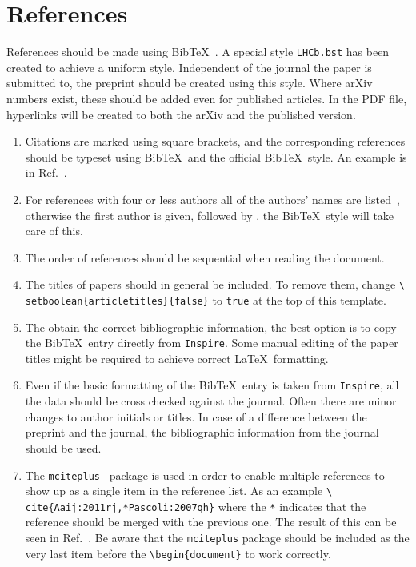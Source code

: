 \section{References}
\label{sec:References}

References should be made using Bib\TeX~\cite{BibTeX}. A special style
\texttt{LHCb.bst} has been created to achieve a uniform
style. Independent of the journal the paper is submitted to, the
preprint should be created using this style. Where arXiv numbers
exist, these should be added even for published articles. In the PDF
file, hyperlinks will be created to both the arXiv and the published
version.

\begin{enumerate}

\item Citations are marked using square brackets, and the
  corresponding references should be typeset using Bib\TeX\ and the
  official \lhcb Bib\TeX\ style. An example is in
  Ref.~\cite{Sjostrand:2006za}.

\item For references with four or less authors all of the authors'
  names are listed~\cite{Majorana:1937vz}, otherwise the first author
  is given, followed by \etal. the \lhcb Bib\TeX\ style will
  take care of this.

\item The order of references should be sequential when reading the
  document.

\item The titles of papers should in general be included. To remove
  them, change \texttt{\textbackslash
    setboolean\{articletitles\}\{false\}} to \texttt{true} at the top
  of this template.

\item The obtain the correct bibliographic information, the best
  option is to copy the Bib\TeX\ entry directly from
  \texttt{Inspire}. Some manual editing of the paper titles might be
  required to achieve correct \LaTeX\ formatting.

\item Even if the basic formatting of the Bib\TeX\ entry is taken from
  \texttt{Inspire}, all the data should be cross checked against the
  journal. Often there are minor changes to author initials or
  titles. In case of a difference between the preprint and the
  journal, the bibliographic information from the journal should be
  used.

\item The \texttt{mciteplus}~\cite{mciteplus} package is used in order
  to enable multiple references to show up as a single item in the
  reference list. As an example \texttt{\textbackslash
    cite\{Aaij:2011rj,*Pascoli:2007qh\}} where the \texttt{*}
  indicates that the reference should be merged with the previous
  one. The result of this can be seen in
  Ref.~\cite{Aaij:2011rj,*Pascoli:2007qh}. Be aware that the
  \texttt{mciteplus} package should be included as the very last item
  before the \texttt{\textbackslash begin\{document\}} to work
  correctly.


\end{enumerate}
